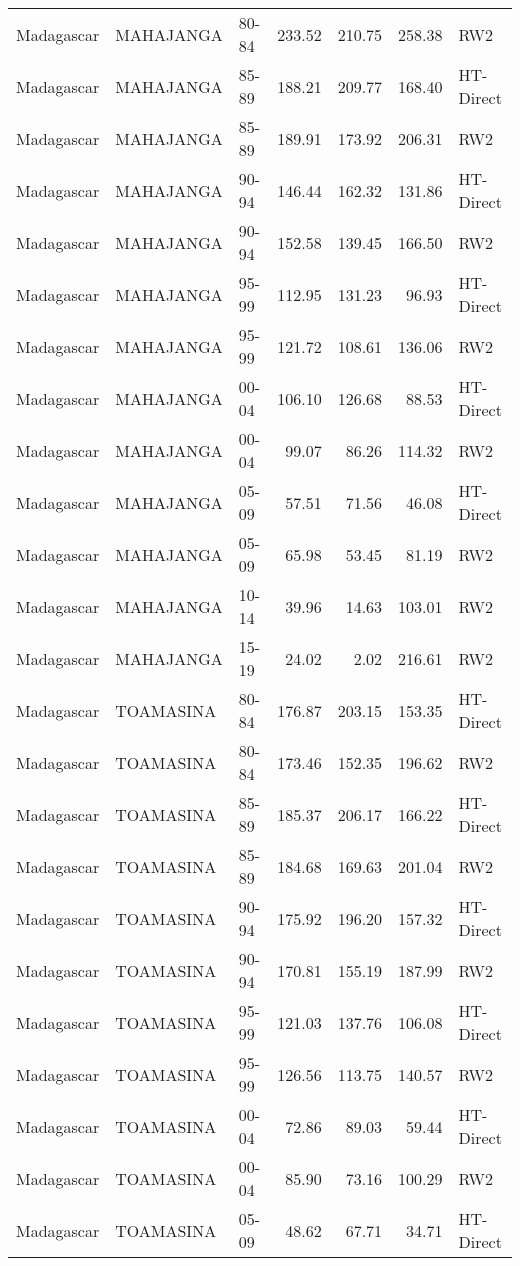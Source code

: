 \begin{longtable}{lllrrrl}
  Madagascar & MAHAJANGA & 80-84 & 233.52 & 210.75 & 258.38 & RW2 \\ 
  Madagascar & MAHAJANGA & 85-89 & 188.21 & 209.77 & 168.40 & HT-Direct \\ 
  Madagascar & MAHAJANGA & 85-89 & 189.91 & 173.92 & 206.31 & RW2 \\ 
  Madagascar & MAHAJANGA & 90-94 & 146.44 & 162.32 & 131.86 & HT-Direct \\ 
  Madagascar & MAHAJANGA & 90-94 & 152.58 & 139.45 & 166.50 & RW2 \\ 
  Madagascar & MAHAJANGA & 95-99 & 112.95 & 131.23 & 96.93 & HT-Direct \\ 
  Madagascar & MAHAJANGA & 95-99 & 121.72 & 108.61 & 136.06 & RW2 \\ 
  Madagascar & MAHAJANGA & 00-04 & 106.10 & 126.68 & 88.53 & HT-Direct \\ 
  Madagascar & MAHAJANGA & 00-04 & 99.07 & 86.26 & 114.32 & RW2 \\ 
  Madagascar & MAHAJANGA & 05-09 & 57.51 & 71.56 & 46.08 & HT-Direct \\ 
  Madagascar & MAHAJANGA & 05-09 & 65.98 & 53.45 & 81.19 & RW2 \\ 
  Madagascar & MAHAJANGA & 10-14 & 39.96 & 14.63 & 103.01 & RW2 \\ 
  Madagascar & MAHAJANGA & 15-19 & 24.02 & 2.02 & 216.61 & RW2 \\ 
  Madagascar & TOAMASINA & 80-84 & 176.87 & 203.15 & 153.35 & HT-Direct \\ 
  Madagascar & TOAMASINA & 80-84 & 173.46 & 152.35 & 196.62 & RW2 \\ 
  Madagascar & TOAMASINA & 85-89 & 185.37 & 206.17 & 166.22 & HT-Direct \\ 
  Madagascar & TOAMASINA & 85-89 & 184.68 & 169.63 & 201.04 & RW2 \\ 
  Madagascar & TOAMASINA & 90-94 & 175.92 & 196.20 & 157.32 & HT-Direct \\ 
  Madagascar & TOAMASINA & 90-94 & 170.81 & 155.19 & 187.99 & RW2 \\ 
  Madagascar & TOAMASINA & 95-99 & 121.03 & 137.76 & 106.08 & HT-Direct \\ 
  Madagascar & TOAMASINA & 95-99 & 126.56 & 113.75 & 140.57 & RW2 \\ 
  Madagascar & TOAMASINA & 00-04 & 72.86 & 89.03 & 59.44 & HT-Direct \\ 
  Madagascar & TOAMASINA & 00-04 & 85.90 & 73.16 & 100.29 & RW2 \\ 
  Madagascar & TOAMASINA & 05-09 & 48.62 & 67.71 & 34.71 & HT-Direct \\ 

\end{longtable}
